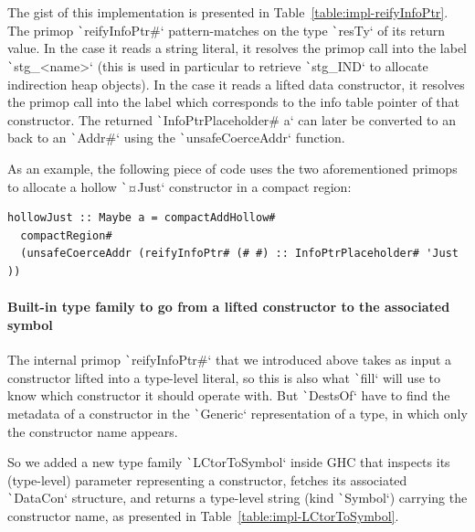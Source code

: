 \documentclass[english]{jflart}
\newlength{\currentparskip}
\newenvironment{unbreakable}
{%
  \setlength{\currentparskip}{\parskip}%
  \setlength{\parskip}{\currentparskip}%
  \par\vspace{0.5\baselineskip}%
  \noindent\begin{minipage}{\textwidth}%
    \setlength{\parskip}{\currentparskip}%
}
{%
  \end{minipage}%
  \par\vspace{0.5\baselineskip}%
}
\begin{document}
The gist of this implementation is presented in Table~\ref{table:impl-reifyInfoPtr}. The primop \texttt`reifyInfoPtr#` pattern-matches on the type \texttt`resTy` of its return value. In the case it reads a string literal, it resolves the primop call into the label \texttt`stg_<name>` (this is used in particular to retrieve \texttt`stg_IND` to allocate indirection heap objects). In the case it reads a lifted data constructor, it resolves the primop call into the label which corresponds to the info table pointer of that constructor. The returned \texttt`InfoPtrPlaceholder# a` can later be converted to an back to an \texttt`Addr#` using the \texttt`unsafeCoerceAddr` function.

As an example, the following piece of code uses the two aforementioned primops to allocate a hollow \texttt`¤Just` constructor in a compact region:

\begin{unbreakable}
{\small
\begin{verbatim}
hollowJust :: Maybe a = compactAddHollow#
  compactRegion#
  (unsafeCoerceAddr (reifyInfoPtr# (# #) :: InfoPtrPlaceholder# 'Just ))
\end{verbatim}
}
\end{unbreakable}

\paragraph{Built-in type family to go from a lifted constructor to the associated symbol}

The internal primop \texttt`reifyInfoPtr#` that we introduced above takes as input a constructor lifted into a type-level literal, so this is also what \texttt`fill` will use to know which constructor it should operate with. But \texttt`DestsOf` have to find the metadata of a constructor in the \texttt`Generic` representation of a type, in which only the constructor name appears.

So we added a new type family \texttt`LCtorToSymbol` inside GHC that inspects its (type-level) parameter representing a constructor, fetches its associated \texttt`DataCon` structure, and returns a type-level string (kind \texttt`Symbol`) carrying the constructor name, as presented in Table~\ref{table:impl-LCtorToSymbol}.
\end{document}
